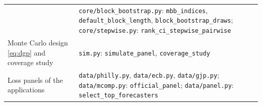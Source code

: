 \begin{table}[htb]
\begin{tabular}{p{5.4cm}p{8.4cm}}
      & \texttt{core/block\_bootstrap.py}: \texttt{mbb\_indices},
        \texttt{default\_block\_length}, \texttt{block\_bootstrap\_draws};
        \texttt{core/stepwise.py}: \texttt{rank\_ci\_stepwise\_pairwise}\\
    Monte Carlo design \eqref{eq:dgp} and coverage study
      & \texttt{sim.py}: \texttt{simulate\_panel}, \texttt{coverage\_study}\\
    Loss panels of the applications
      & \texttt{data/philly.py}, \texttt{data/ecb.py}, \texttt{data/gjp.py};
        \texttt{data/mcomp.py}: \texttt{official\_panel};
        \texttt{data/panel.py}: \texttt{select\_top\_forecasters}\\
    \bottomrule
  \end{tabular}
\end{table}
